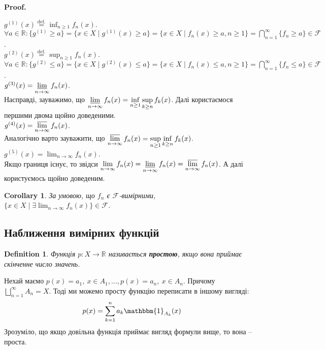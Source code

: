 \documentclass[a4paper, 10pt]{article}
\makeatletter
\theoremstyle{theoremdd}
\newtheorem{definition}[theorem]{Definition}
\newtheorem{corollary}[theorem]{Corollary}
\renewenvironment{proof}[1][Proof.\\]{\par
\pushQED{\hfill \qed}%
\normalfont \topsep6\p@\@plus6\p@\relax
\trivlist
\item\relax
{\bfseries
#1\@addpunct{.}}\hspace\labelsep\ignorespaces
}{%
\popQED\endtrivlist\@endpefalse
}
\makeatother
\begin{document}
\begin{proof}
$\displaystyle g^{(1)}(x) \overset{\text{def.}}{=} \inf_{n \geq 1}f_n(x)$.\\
$\forall a \in \mathbb{R}: \{g^{(1)} \geq a\} = \{ x \in X \mid g^{(1)}(x) \geq a\} = \{ x \in X \mid f_n(x) \geq a, n \geq 1\} = \displaystyle\bigcap_{n=1}^\infty \{f_n \geq a\} \in \mathcal{F}$.
\\
$\displaystyle g^{(2)}(x) \overset{\text{def.}}{=} \sup_{n \geq 1}f_n(x)$.\\
$\forall a \in \mathbb{R}: \{g^{(2)} \leq a\} = \{ x \in X \mid g^{(2)}(x) \leq a\} = \{ x \in X \mid f_n(x) \leq a, n \geq 1\} = \displaystyle\bigcap_{n=1}^\infty \{f_n \leq a\} \in \mathcal{F}$.
\bigskip \\
$g^{(3)}(x) = \displaystyle\varliminf_{n \to \infty} f_n(x)$.\\
Насправді, зауважимо, що $\displaystyle\varliminf_{n \to \infty} f_n(x) = \inf_{n \geq 1} \sup_{k \geq n} f_k(x)$. Далі користаємося першими двома щойно доведеними.\\
$g^{(4)}(x) = \displaystyle\varlimsup_{n \to \infty} f_n(x)$.\\
Аналогічно варто зауважити, що $\displaystyle\varlimsup_{n \to \infty} f_n(x) = \sup_{n \geq 1} \inf_{k \geq n} f_k(x)$.
\bigskip \\
$g^{(5)}(x) = \displaystyle\lim_{n \to \infty} f_n(x)$.\\
Якщо границя існує, то звідси $\displaystyle\lim_{n \to \infty} f_n(x) = \varliminf_{n \to \infty} f_n(x) = \varlimsup_{n \to \infty} f_n(x)$. А далі користуємось щойно доведеним.
\end{proof}

\begin{corollary}
За умовою, що $f_n$ є $\mathcal{F}$-вимірними, $\displaystyle\{x \in X \mid \exists \lim_{n \to \infty} f_n(x)\} \in \mathcal{F}$.
\end{corollary}

\subsection{Наближення вимірних функцій}
\begin{definition}
Функція $p \colon X \to \mathbb{R}$ називається \textbf{простою}, якщо вона приймає скінченне число значень.
\end{definition}
\noindent Нехай маємо $p(x) = a_1,\ x \in A_1, \dots, p(x) = a_n,\ x \in A_n$. Причому $\displaystyle\bigsqcup_{n=1}^\infty A_n = X$. Тоді ми можемо просту функцію переписати в іншому вигляді:
\begin{align*}
p(x) = \sum_{k=1}^n a_k \mathbbm{1}_{A_k}(x)
\end{align*}
Зрозуміло, що якщо довільна функція приймає вигляд формули вище, то вона -- проста.
\end{document}
